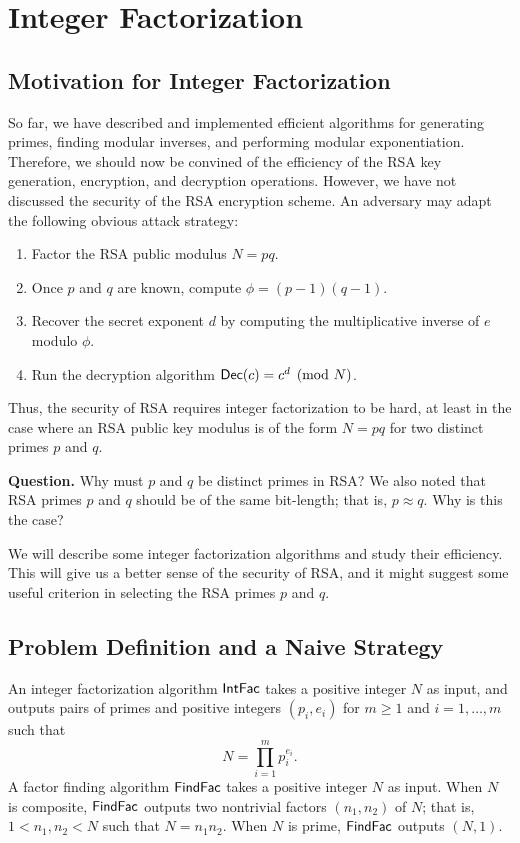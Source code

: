\section{Integer Factorization}

\subsection{Motivation for Integer Factorization}
So far, we have described and implemented efficient algorithms for generating
primes, finding modular inverses, and performing modular exponentiation. 
Therefore, we should now be convined of the efficiency of the RSA key generation,
encryption, and decryption operations. However, we have not discussed the 
security of the RSA encryption scheme. An adversary may adapt the following 
obvious attack strategy:
\begin{enumerate}
    \item Factor the RSA public modulus $N = pq$. 
    \item Once $p$ and $q$ are known, compute $\phi = (p-1)(q-1)$. 
    \item Recover the secret exponent $d$ by computing the multiplicative inverse
    of $e$ modulo $\phi$. 
    \item Run the decryption algorithm ${\sf Dec}(c) = c^d \pmod N$. 
\end{enumerate}
Thus, the security of RSA requires integer factorization to be hard, at least 
in the case where an RSA public key modulus is of the form $N = pq$ for 
two distinct primes $p$ and $q$. 

{\bf Question.} Why must $p$ and $q$ be distinct primes in RSA? We also noted 
that RSA primes $p$ and $q$ should be of the same bit-length; that is, 
$p \approx q$. Why is this the case?

We will describe some integer factorization algorithms and study their efficiency.
This will give us a better sense of the security of RSA, and it might suggest 
some useful criterion in selecting the RSA primes $p$ and $q$. 

\subsection{Problem Definition and a Naive Strategy}
An integer factorization algorithm ${\sf IntFac}$ takes a positive integer $N$ as input,
and outputs pairs of primes and positive integers $(p_i, e_i)$ for $m \geq 1$ 
and $i = 1, \dots, m$ such that 
\[ N = \prod_{i=1}^m p_i^{e_i}. \]
A factor finding algorithm ${\sf FindFac}$ takes a positive integer $N$ as input. 
When $N$ is composite, ${\sf FindFac}$ outputs two nontrivial factors $(n_1, n_2)$ of 
$N$; that is, $1 < n_1, n_2 < N$ such that $N = n_1n_2$. When $N$ is prime, 
${\sf FindFac}$ outputs $(N, 1)$. 


